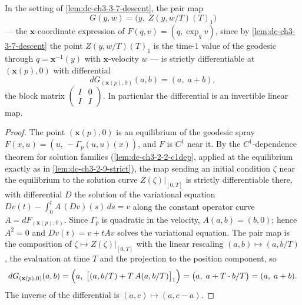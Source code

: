 \begin{lemma}
  \label{lem:dc-ch3-3-7-pairmap}


  In the setting of \cref{lem:dc-ch3-3-7-descent}, the pair map
  $$
  G(y,w)=\bigl(y,\;Z(y,w/T)(T)_1\bigr)
  $$
  — the $\mathbf{x}$-coordinate expression of $F(q,v)=(q,\exp_q v)$, since by
  \cref{lem:dc-ch3-3-7-descent} the point $Z(y,w/T)(T)_1$ is the time-$1$ value
  of the geodesic through $q=\mathbf{x}^{-1}(y)$ with $\mathbf{x}$-velocity $w$ —
  is strictly differentiable at $(\mathbf{x}(p),0)$ with differential
  $$
  dG_{(\mathbf{x}(p),0)}(a,b)=(a,\;a+b),
  $$
  the block matrix $\begin{pmatrix}I & 0\\ I & I\end{pmatrix}$. In
  particular the differential is an invertible linear map.
\end{lemma}
\begin{proof}
  \sketch

  The point $(\mathbf{x}(p),0)$ is an equilibrium of the geodesic spray
  $F(x,u)=(u,\,-\Gamma_p(u,u)(x))$, and $F$ is $C^1$ near it. By the
  $C^1$-dependence theorem for solution families
  (\cref{lem:dc-ch3-2-2-c1dep}, applied at the equilibrium exactly as in
  \cref{lem:dc-ch3-2-9-strict}), the map sending an initial condition $\zeta$
  near the equilibrium to the solution curve $Z(\zeta)|_{[0,T]}$ is strictly
  differentiable there, with differential $D$ the solution of the variational
  equation $Dv(t)-\int_0^t A\,(Dv)(s)\,ds=v$ along the constant operator curve
  $A=dF_{(\mathbf{x}(p),0)}$. Since $\Gamma_p$ is quadratic in the velocity,
  $A(a,b)=(b,0)$; hence $A^2=0$ and $Dv(t)=v+tAv$ solves the variational
  equation. The pair map is the composition of $\zeta\mapsto Z(\zeta)|_{[0,T]}$
  with the linear rescaling $(a,b)\mapsto(a,b/T)$, the evaluation at time $T$
  and the projection to the position component, so
  $$
  dG_{(\mathbf{x}(p),0)}(a,b)
    =\Bigl(a,\;\bigl[(a,b/T)+T\,A(a,b/T)\bigr]_1\Bigr)
    =\bigl(a,\;a+T\cdot b/T\bigr)=(a,\;a+b).
  $$
  The inverse of the differential is $(a,c)\mapsto(a,c-a)$.
\end{proof}

